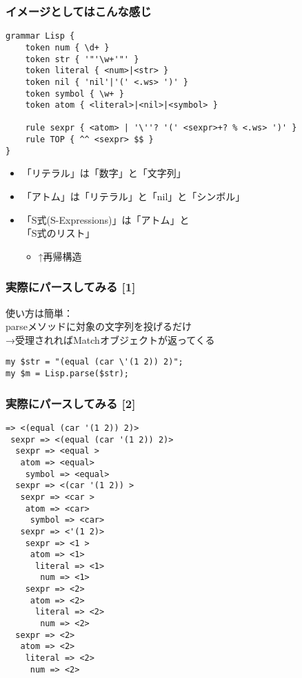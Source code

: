 \documentclass[14pt,dvipdfm,trans]{beamer}
\begin{document}
\begin{frame}[fragile]
 \frametitle{イメージとしてはこんな感じ}
 \begin{lstlisting}
grammar Lisp {
    token num { \d+ }
    token str { '"'\w+'"' }
    token literal { <num>|<str> }
    token nil { 'nil'|'(' <.ws> ')' }
    token symbol { \w+ }
    token atom { <literal>|<nil>|<symbol> }

    rule sexpr { <atom> | '\''? '(' <sexpr>+? % <.ws> ')' }
    rule TOP { ^^ <sexpr> $$ }
}
 \end{lstlisting} 
\pause
\begin{itemize}
 \item <2-> 「リテラル」は「数字」と「文字列」
 \item <3-> 「アトム」は「リテラル」と「nil」と「シンボル」
 \vspace{0.2zh}
 \item <4-> 「S式(S-Expressions)」は「アトム」と\\「S式のリスト」
 \vspace{0.5zh}
       \begin{itemize}
	\item <5-> ↑再帰構造
       \end{itemize}
\end{itemize}

\end{frame}

\begin{frame}[fragile]
 \frametitle{実際にパースしてみる [1]}
使い方は簡単：\\
\hspace{1zh}parseメソッドに対象の文字列を投げるだけ\\
\hspace{1zh}→受理されればMatchオブジェクトが返ってくる
\vspace{3zh}
\begin{lstlisting}
my $str = "(equal (car \'(1 2)) 2)";
my $m = Lisp.parse($str);
\end{lstlisting}
\end{frame}

\begin{frame}[fragile]
 \frametitle{実際にパースしてみる [2]}
\begin{lstlisting}
=> <(equal (car '(1 2)) 2)>
 sexpr => <(equal (car '(1 2)) 2)>
  sexpr => <equal >
   atom => <equal>
    symbol => <equal>
  sexpr => <(car '(1 2)) >
   sexpr => <car >
    atom => <car>
     symbol => <car>
   sexpr => <'(1 2)>
    sexpr => <1 >
     atom => <1>
      literal => <1>
       num => <1>
    sexpr => <2>
     atom => <2>
      literal => <2>
       num => <2>
  sexpr => <2>
   atom => <2>
    literal => <2>
     num => <2>
\end{lstlisting}
\end{frame}
\end{document}
